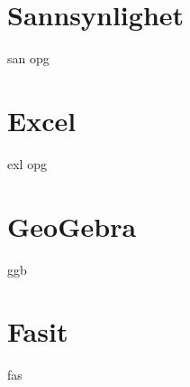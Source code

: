 \chapter{Sannsynlighet \label{San}} 
{san}
{opg}
\newpage

\chapter*{Excel} 
{exl}	
\newpage
{opg}	

\chapter*{GeoGebra} 
{ggb}	

\chapter*{Fasit}
{fas}





